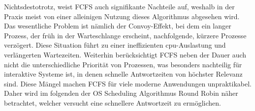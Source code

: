 Nichtsdestotrotz, weist \ac{FCFS} auch signifikante Nachteile auf, weshalb in der Praxis meist von einer alleinigen Nutzung dieses Algorithmus abgesehen wird. Das wesentliche Problem ist nämlich der Convoy-Effekt, bei dem ein langer Prozess, der früh in der Warteschlange erscheint, nachfolgende, kürzere Prozesse verzögert. Diese Situation führt zu einer ineffizienten \ac{cpu}-Auslastung und verlängerten Wartezeiten. %
Weiterhin berücksichtigt \ac{FCFS} neben der Dauer auch nicht die unterschiedliche Priorität von Prozessen, was besonders nachteilig für interaktive Systeme ist, in denen schnelle Antwortzeiten von höchster Relevanz sind. Diese Mängel machen \ac{FCFS} für viele moderne Anwendungen unpraktikabel. Daher wird im folgenden der OS Scheduling Algorithmus Round Robin näher betrachtet, welcher versucht eine schnellere Antwortzeit zu ermöglichen.

